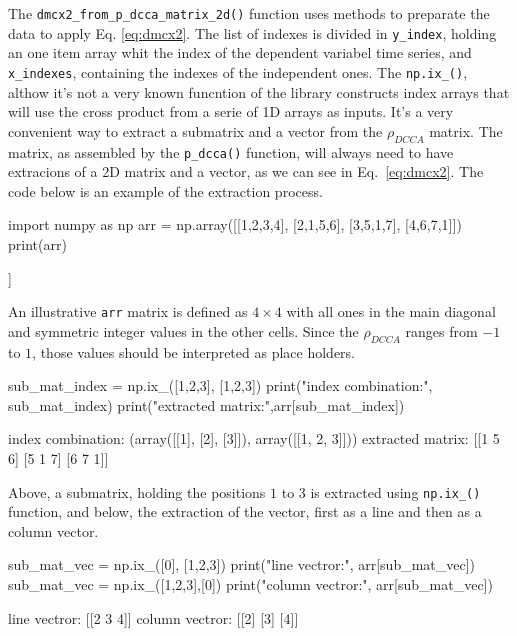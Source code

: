 \documentclass[article]{jss}
\begin{document}
The \verb"dmcx2_from_p_dcca_matrix_2d()" function uses  methods to preparate the data to apply Eq. \ref{eq:dmcx2}. The list of indexes is divided in \verb"y_index", holding an one item array whit the index of the dependent variabel time series, and \verb"x_indexes", containing the indexes of the independent ones. The  \verb"np.ix_()", althow it's not a very known funcntion of the library constructs index arrays that will use the cross product from a serie of 1D arrays as inputs. It's a very convenient way to extract a submatrix and a vector from the $\rho_{DCCA}$ matrix. The matrix, as assembled by the \verb"p_dcca()" function, will always need to have extracions of a 2D matrix and a vector, as we can see in Eq.~\ref{eq:dmcx2}. The code below is an example of the extraction process.

\begin{CodeChunk}
\begin{CodeInput}
import numpy as np
arr = np.array([[1,2,3,4],
                [2,1,5,6],
                [3,5,1,7],
                [4,6,7,1]])
print(arr)
\end{CodeInput}

\begin{CodeOutput}
[[1 2 3 4]
 [2 1 5 6]
 [3 5 1 7]
 [4 6 7 1]]
\end{CodeOutput}
An illustrative \verb"arr" matrix is defined as $4 \times 4$ with all ones in the main diagonal and symmetric integer values in the other cells. Since the $\rho_{DCCA}$ ranges from $-1$ to $1$, those values should be interpreted as place holders. 
\begin{CodeInput}
sub_mat_index = np.ix_([1,2,3], [1,2,3])
print("index combination:\n", sub_mat_index)
print("extracted matrix:\n",arr[sub_mat_index])
\end{CodeInput}

\begin{CodeOutput}
index combination:
(array([[1],
      [2],
      [3]]), array([[1, 2, 3]]))
extracted matrix:
[[1 5 6]
[5 1 7]
[6 7 1]]
\end{CodeOutput}

Above, a submatrix, holding the positions $1$ to $3$ is extracted using \verb"np.ix_()" function, and below, the extraction of the vector, first as a line and then as a column vector.

\begin{CodeInput}
sub_mat_vec = np.ix_([0], [1,2,3])
print("line vectror:\n", arr[sub_mat_vec])
sub_mat_vec = np.ix_([1,2,3],[0])
print("column vectror:\n", arr[sub_mat_vec])
\end{CodeInput}

\begin{CodeOutput}
line vectror:
[[2 3 4]]
column vectror:
[[2]
[3]
[4]]
\end{CodeOutput}
\end{CodeChunk}
\end{document}
